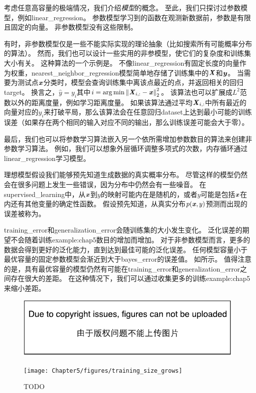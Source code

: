 
考虑任意高容量的极端情况，我们介绍\emph{模型}的概念。
至此，我们只探讨过参数模型，例如\gls{linear_regression}。
参数模型学习到的函数在观测新数据前，参数是有限且固定的向量。
非参数模型没有这些限制。

有时，非参数模型仅是一些不能实际实现的理论抽象（比如搜索所有可能概率分布的算法）。
然而，我们也可以设计一些实用的非参模型，使它们的复杂度和训练集大小有关。
这种算法的一个示例是。
不像\gls{linear_regression}有固定长度的向量作为权重，\gls{nearest_neighbor_regression}模型简单地存储了训练集中的$\boldsymbol{\mathit{X}}$和$\boldsymbol{\mathit{y}}$。
当需要为测试点$\boldsymbol{\mathit{x}}$分类时，模型会查询训练集中离该点最近的点，并返回相关的回归\gls{target}。
换言之，$\hat{y}=y_i$其中$i=\arg\min\left\lVert\boldsymbol{\mathit{X}}_{i,:}-\boldsymbol{\mathit{x}}\right\rVert_2^2$。
该算法也可以扩展成$L^2$范数以外的距离度量，例如学习距离度量\citep{RoweisNCA2005}。
如果该算法通过平均$\boldsymbol{\mathit{X}}_{i,:}$中所有最近的向量对应的$y_i$来打破平局，那么该算法会在任意回归\gls{dataset}上达到最小可能的训练误差（如果存在两个相同的输入对应不同的输出，那么训练误差可能会大于零）。

最后，我们也可以将参数学习算法嵌入另一个依所需增加参数数目的算法来创建非参数学习算法。
例如，我们可以想象外层循环调整多项式的次数，内存循环通过\gls{linear_regression}学习模型。


理想模型假设我们能够预先知道生成数据的真实概率分布。
尽管这样的模型仍然会在很多问题上发生一些错误，因为分布中仍然会有一些噪音。
在\gls{supervised_learning}中，从$\boldsymbol{\mathit{x}}$到$y$的映射可能内在是随机的，或者$y$可能是包括$\boldsymbol{\mathit{x}}$在内还有其他变量的确定性函数。
假设预先知道，从真实分布$p(\boldsymbol{\mathit{x}},y)$预测而出现的误差被称为。

\gls{training_error}和\gls{generalization_error}会随训练集的大小发生变化。
泛化误差的期望不会随着训练\gls{example:chap5}数目的增加而增加。
对于非参数模型而言，更多的数据会得到更好的泛化能力，直到达到最佳可能的泛化误差。
任何模型容量小于最优容量的固定参数模型会渐近到大于\gls{bayes_error}的误差值。
如所示。
值得注意的是，具有最优容量的模型仍然有可能在\gls{training_error}和\gls{generalization_error}之间存在很大的差距。
在这种情况下，我们可以通过收集更多的训练\gls{example:chap5}来缩小差距。

\begin{figure}[!htb]
\ifOpenSource
\centerline{\includegraphics{figure.pdf}}
\else
\centerline{\texttt{[image: Chapter5/figures/training\_size\_grows]}}
\fi
\caption{TODO}
\label{fig:chap5_training_size_grows}
\end{figure}

